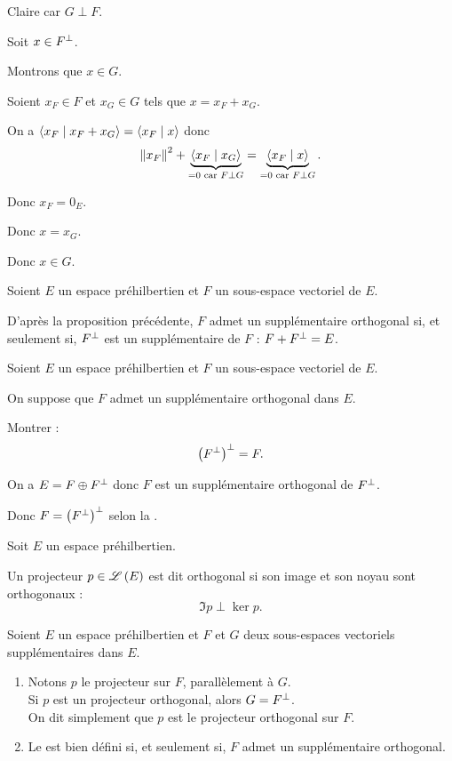 \begin{dem}
\incdir Claire car \(G\perp F\).

\increc

Soit \(x\in F^{\perp}\).

Montrons que \(x\in G\).

Soient \(x_F\in F\) et \(x_G\in G\) tels que \(x=x_F+x_G\).

On a \(\left\langle x_F\;\middle|\; x_F+x_G\right\rangle=\left\langle x_F\;\middle|\; x\right\rangle\) donc \[\left\|x_F\right\|^2+\underbrace{\left\langle x_F\;\middle|\; x_G\right\rangle}_{=0\text{ car }F\perp G}=\underbrace{\left\langle x_F\;\middle|\; x\right\rangle}_{=0\text{ car }F\perp G}.\]

Donc \(x_F=0_E\).

Donc \(x=x_G\).

Donc \(x\in G\).
\end{dem}

\begin{rem}
Soient \(E\) un espace préhilbertien et \(F\) un sous-espace vectoriel de \(E\).

D'après la proposition précédente, \(F\) admet un supplémentaire orthogonal si, et seulement si, \(F^{\perp}\) est un supplémentaire de \(F\) : \(F+F^{\perp}=E\).
\end{rem}

\begin{exo}
Soient \(E\) un espace préhilbertien et \(F\) un sous-espace vectoriel de \(E\).

On suppose que \(F\) admet un supplémentaire orthogonal dans \(E\).

Montrer : \[\left(F^{\perp}\right)^{\perp}=F.\]
\end{exo}

\begin{corr}
On a \(E=F\oplus F^{\perp}\) donc \(F\) est un supplémentaire orthogonal de \(F^{\perp}\).

Donc \(F=\left(F^{\perp}\right)^{\perp}\) selon la .
\end{corr}

\begin{defi}
Soit \(E\) un espace préhilbertien.

Un projecteur \(p\in\mathscr{L}\left(E\right)\) est dit orthogonal si son image et son noyau sont orthogonaux : \[\Im p\perp\ker p.\]
\end{defi}

\begin{rem}
Soient \(E\) un espace préhilbertien et \(F\) et \(G\) deux sous-espaces vectoriels supplémentaires dans \(E\).

\begin{enumerate}
    \item Notons \(p\) le projecteur sur \(F\), parallèlement à \(G\). \\ Si \(p\) est un projecteur orthogonal, alors \(G=F^{\perp}\). \\ On dit simplement que \(p\) est le projecteur orthogonal sur \(F\). \\
    \item Le  est bien défini si, et seulement si, \(F\) admet un supplémentaire orthogonal.
\end{enumerate}
\end{rem}

